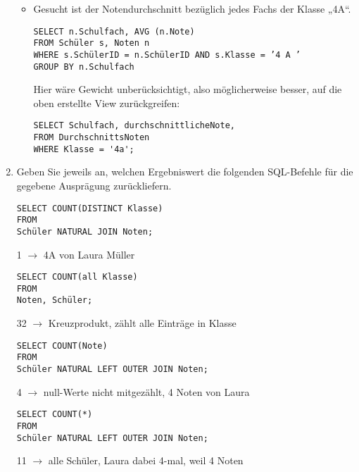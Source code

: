\documentclass{lehramt-informatik-aufgabe}
\begin{document}
\begin{enumerate}
\begin{itemize}
%

\item Gesucht ist der Notendurchschnitt bezüglich jedes Fachs der Klasse
„4A“.

\begin{antwort}
\begin{verbatim}
SELECT n.Schulfach, AVG (n.Note)
FROM Schüler s, Noten n
WHERE s.SchülerID = n.SchülerID AND s.Klasse = ’4 A ’
GROUP BY n.Schulfach
\end{verbatim}

Hier wäre Gewicht unberücksichtigt, also möglicherweise besser, auf die oben erstellte
View zurückgreifen:

\begin{verbatim}
SELECT Schulfach, durchschnittlicheNote,
FROM DurchschnittsNoten
WHERE Klasse = '4a';
\end{verbatim}
\end{antwort}
\end{itemize}


\item Geben Sie jeweils an, welchen Ergebniswert die folgenden
SQL-Befehle für die gegebene Ausprägung zurückliefern.

\begin{verbatim}
SELECT COUNT(DISTINCT Klasse)
FROM
Schüler NATURAL JOIN Noten;
\end{verbatim}

\begin{antwort}
1 $\rightarrow$ 4A von Laura Müller
\end{antwort}

\begin{verbatim}
SELECT COUNT(all Klasse)
FROM
Noten, Schüler;
\end{verbatim}

\begin{antwort}
32 $\rightarrow$ Kreuzprodukt, zählt alle Einträge in Klasse
\end{antwort}

\begin{verbatim}
SELECT COUNT(Note)
FROM
Schüler NATURAL LEFT OUTER JOIN Noten;
\end{verbatim}

\begin{antwort}
4 $\rightarrow$ null-Werte nicht mitgezählt, 4 Noten von Laura
\end{antwort}

\begin{verbatim}
SELECT COUNT(*)
FROM
Schüler NATURAL LEFT OUTER JOIN Noten;
\end{verbatim}

\begin{antwort}
11 $\rightarrow$ alle Schüler, Laura dabei 4-mal, weil 4 Noten
\end{antwort}
\end{enumerate}
\end{document}
